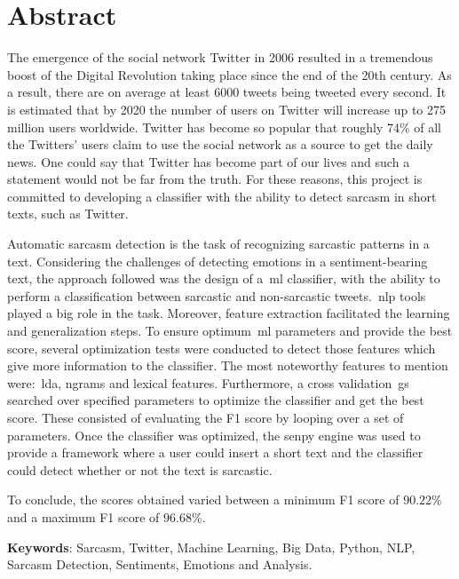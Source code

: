 \cleardoublepage
{}
\chapter*{Abstract}
The emergence of the social network Twitter in 2006 resulted in a tremendous boost of the Digital Revolution taking place since the end of the 20th century. As a result, there are on average at least 6000 tweets being tweeted every second. It is estimated that by 2020 the number of users on Twitter will increase up to 275 million users worldwide. Twitter has become so popular that roughly 74\% of all the Twitters' users claim to use the social network as a source to get the daily news. One could say that Twitter has become part of our lives and such a statement would not be far from the truth. For these reasons, this project is committed to developing a classifier with the ability to detect sarcasm in short texts, such as Twitter. \par
Automatic sarcasm detection is the task of recognizing sarcastic patterns in a text. Considering the challenges of detecting emotions in a sentiment-bearing text, the approach followed was the design of a~\acl{ml} classifier, with the ability to perform a classification between sarcastic and non-sarcastic tweets.~\acl{nlp} tools played a big role in the task. Moreover, feature extraction facilitated the learning and generalization steps. To ensure optimum~\acl{ml} parameters and provide the best score, several optimization tests were conducted to detect those features which give more information to the classifier. The most noteworthy features to mention were:~\acf{lda}, ngrams and lexical features. Furthermore, a cross validation~\acl{gs} searched over specified parameters to optimize the classifier and get the best score. These consisted of evaluating the F1 score by looping over a set of parameters.  Once the classifier was optimized, the senpy engine was used to provide a framework where a user could insert a short text and the classifier could detect whether or not the text is sarcastic.\par
To conclude, the scores obtained varied between a minimum F1 score of $90.22$\% and a maximum F1 score of $96.68$\%. 



\vfill
\textbf{Keywords}: Sarcasm, Twitter, Machine Learning, Big Data, Python, NLP, Sarcasm Detection, Sentiments, Emotions and Analysis.